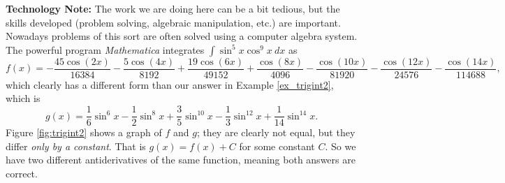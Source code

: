 \noindent\textbf{Technology Note:} The work we are doing here can be a bit tedious, but the skills developed (problem solving, algebraic manipulation, etc.) are important. Nowadays problems of this sort are often solved using a computer algebra system. The powerful program \textit{Mathematica}\textsuperscript{\textregistered} integrates $\int \sin^5x\cos^9x\ dx$ as \small$$f(x)=-\frac{45 \cos (2 x)}{16384}-\frac{5 \cos (4 x)}{8192}+\frac{19 \cos (6
   x)}{49152}+\frac{\cos (8 x)}{4096}-\frac{\cos (10 x)}{81920}-\frac{\cos (12
   x)}{24576}-\frac{\cos (14 x)}{114688},$$\normalsize
which clearly has a different form than our answer in Example \ref{ex_trigint2}, which is
$$g(x)=\frac16\sin^6 x-\frac12\sin^8 x+\frac35\sin^{10} x-\frac13\sin^{12} x+\frac{1}{14}\sin^{14} x.$$ Figure \ref{fig:trigint2} shows a graph of $f$ and $g$; they are clearly not equal, but they differ \emph{only by a constant}. That is $g(x) = f(x) + C$ for some constant $C$. So we have two different antiderivatives of the same function, meaning both answers are correct.\\  %
\enlargethispage{\baselineskip}


